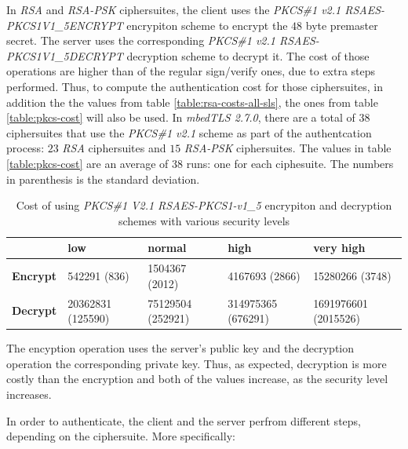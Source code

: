 \documentclass{llncs}
\begin{document}
In \textit{RSA} and \textit{RSA-PSK} ciphersuites, the client uses the \textit{PKCS\#1 v2.1 RSAES-PKCS1\-V1\_5\-ENCRYPT}\cite{RFC3447} 
encrypiton scheme to encrypt  the $48$ byte premaster secret. The server uses the corresponding \textit{PKCS\#1 v2.1 RSAES-PKCS1\-V1\_5\-DECRYPT}\cite{RFC3447}
decryption scheme to decrypt it. The cost of those operations are higher than of the regular sign/verify ones, due to extra steps performed.
Thus, to compute the authentication cost for those ciphersuites, in addition the the values from table \ref{table:rsa-costs-all-sls}, the ones
from table \ref{table:pkcs-cost} will also be used. In \textit{mbedTLS 2.7.0}, there are a total of
$38$ ciphersuites that use the \textit{PKCS\#1 v2.1} scheme as part of the authentcation process: $23$
\textit{RSA} ciphersuites and $15$ \textit{RSA-PSK} ciphersuites. The values in table \ref{table:pkcs-cost} are an average
of $38$ runs: one for each ciphesuite. The numbers in parenthesis is the standard deviation.

\begin{table}[]
  \begin{tabular}{|l|l|l|l|l|}
  \hline
                   & \textbf{low}      & \textbf{normal}   & \textbf{high}      & \textbf{very high}   \\ \hline
  \textbf{Encrypt} & 542291 (836)      & 1504367 (2012)    & 4167693 (2866)     & 15280266 (3748)      \\ \hline
  \textbf{Decrypt} & 20362831 (125590) & 75129504 (252921) & 314975365 (676291) & 1691976601 (2015526) \\ \hline
  \end{tabular}
  \centering \caption{\label{table:pkcs-costt} Cost of using \textit{PKCS\#1 V2.1 RSAES-PKCS1-v1\_5} encrypiton and decryption schemes with various security levels}
  \end{table}

The encyption operation uses the server's public key and the decryption operation the corresponding private key. Thus, as expected,
decryption is more costly than the encryption and both of the values increase, as the security level increases.

In order to authenticate, the client and the server perfrom different steps, depending on the ciphersuite. More specifically:
\end{document}
